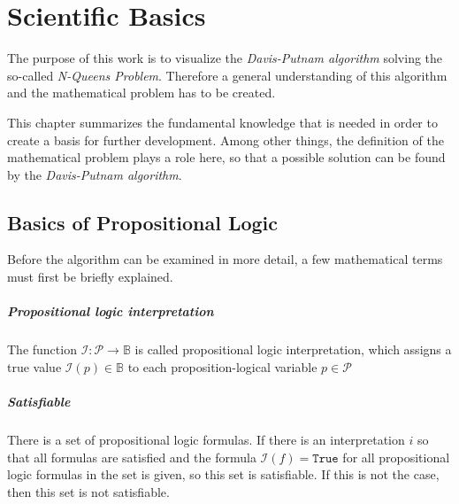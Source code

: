 

\chapter{Scientific Basics}
\label{ch:sciBasics}
The purpose of this work is to visualize the \textit{Davis-Putnam algorithm} solving the so-called \textit{N-Queens Problem}. Therefore a general understanding of this algorithm and the mathematical problem has to be created.

This chapter summarizes the fundamental knowledge that is needed in order to create a basis for further development. Among other things, the definition of the mathematical problem plays a role here, so that a possible solution can be found by the \textit{Davis-Putnam algorithm}.

\section{Basics of Propositional Logic}
\label{sec:sciProLogic}
Before the algorithm can be examined in more detail, a few mathematical terms must first be briefly explained.

\paragraph{Propositional logic interpretation}
The function $\mathcal{I}:\mathcal{P} \rightarrow \mathbb{B}$ is called propositional logic interpretation, which assigns a true value $\mathcal{I}(p) \in \mathbb{B}$ to each proposition-logical variable $p\in \mathcal{P}$

\paragraph{Satisfiable}
There is a set of propositional logic formulas. If there is an interpretation $i$ so that all formulas are satisfied and the formula $\mathcal{I}(f) = \texttt{True}$ \quad for all propositional logic formulas in the set is given, so this set is satisfiable. If this is not the case, then this set is not satisfiable.

